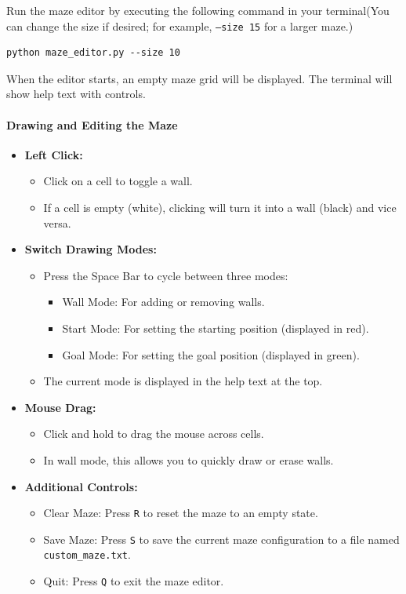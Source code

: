 \documentclass[12pt]{article}
\begin{document}
Run the maze editor by executing the following command in your terminal(You can change the size if desired; for example, \texttt{--size 15} for a larger maze.)
\begin{lstlisting}
python maze_editor.py --size 10
\end{lstlisting}


When the editor starts, an empty maze grid will be displayed. The terminal will show help text with controls.


\paragraph{Drawing and Editing the Maze}
\begin{itemize}
  \item \textbf{Left Click:}
  \begin{itemize}
    \item Click on a cell to toggle a wall.
    \item If a cell is empty (white), clicking will turn it into a wall (black) and vice versa.
  \end{itemize}
  \item \textbf{Switch Drawing Modes:}
  \begin{itemize}
    \item Press the Space Bar to cycle between three modes:
    \begin{itemize}
      \item Wall Mode: For adding or removing walls.
      \item Start Mode: For setting the starting position (displayed in red).
      \item Goal Mode: For setting the goal position (displayed in green).
    \end{itemize}
    \item The current mode is displayed in the help text at the top.
  \end{itemize}
  \item \textbf{Mouse Drag:}
  \begin{itemize}
    \item Click and hold to drag the mouse across cells.
    \item In wall mode, this allows you to quickly draw or erase walls.
  \end{itemize}
  \item \textbf{Additional Controls:}
  \begin{itemize}
    \item Clear Maze: Press \texttt{R} to reset the maze to an empty state.
    \item Save Maze: Press \texttt{S} to save the current maze configuration to a file named \texttt{custom\_maze.txt}.
    \item Quit: Press \texttt{Q} to exit the maze editor.
  \end{itemize}
\end{itemize}
\end{document}
